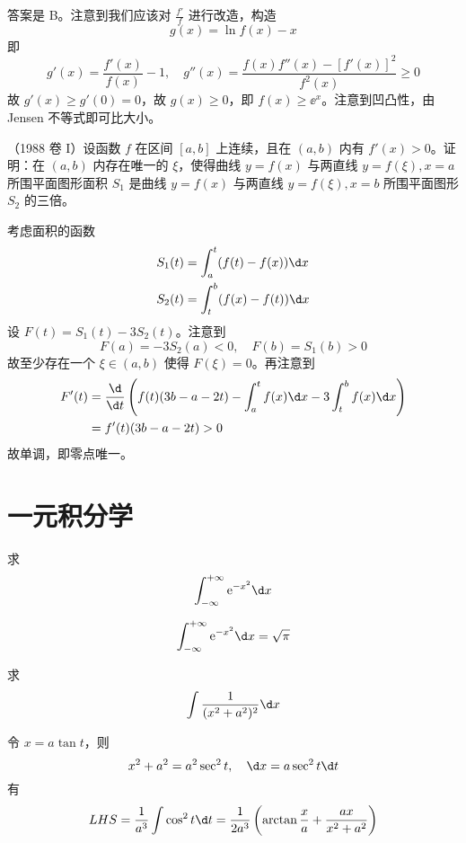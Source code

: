 \begin{solution}
	答案是 B。注意到我们应该对 $\frac{f'}{f}$ 进行改造，构造
	\[ g(x) = \ln f(x) - x \]
	即
	\[ g'(x) = \frac{f'(x)}{f(x)} - 1, \quad g''(x) = \frac{f(x) f''(x) - [f'(x)]^2}{f^2(x)} \geqslant 0 \]
	故 $g'(x) \geqslant g'(0) = 0$，故 $g(x) \geqslant 0$，即 $f(x) \geqslant \ee^x$。注意到凹凸性，由 Jensen 不等式即可比大小。
\end{solution}

\begin{problem}[000032]
	（1988 卷 I）设函数 $f$ 在区间 $[a, b]$ 上连续，且在 $(a, b)$ 内有 $f'(x) > 0$。证明：在 $(a, b)$ 内存在唯一的 $\xi$，使得曲线 $y = f(x)$ 与两直线 $y = f(\xi), x = a$ 所围平面图形面积 $S_1$ 是曲线 $y = f(x)$ 与两直线 $y = f(\xi), x = b$ 所围平面图形 $S_2$ 的三倍。
\end{problem}

\begin{solution}
	考虑面积的函数
	\[  \begin{aligned}
		S_1(t) &= \int_{a}^{t} (f(t) - f(x)) \d x \\
		S_2(t) &= \int_{t}^{b} (f(x) - f(t)) \d x
	\end{aligned} \]
	设 $F(t) = S_1(t) - 3S_2(t)$。注意到
	\[ F(a) = -3S_2(a) < 0, \quad F(b) = S_1(b) > 0 \]
	故至少存在一个 $\xi \in (a, b)$ 使得 $F(\xi) = 0$。再注意到
	\[ \begin{aligned}
		F'(t) 
	&= \frac{\d}{\d t}\left( f(t)(3b - a - 2t) - \int_{a}^{t} f(x) \d x - 3 \int_{t}^{b} f(x) \d x \right) \\
	&= f'(t) (3b - a - 2t) > 0
	\end{aligned} \]
	故单调，即零点唯一。
\end{solution}


\section{一元积分学}

\begin{problem}[000008]
求
\[ \int_{-\infty}^{+\infty} \ee^{-x^2}\d x \]
\end{problem}
\begin{solution}
	\[ \int_{-\infty}^{+\infty} \ee^{-x^2}\d x = \sqrt{\pi} \]
\end{solution}

\begin{problem}[000014]
求
\[ \int \frac{1}{(x^2+a^2)^2} \d x \]
\end{problem}
\begin{solution}
	令 $x = a \tan t$，则
	\[ x^2 + a^2 = a^2 \sec^2 t, \quad \d x = a \sec^2 t \d t \]
	有
	\[ LHS =  \frac{1}{a^3}\int \cos^2 t \d t = \frac{1}{2a^3} \left( \arctan \frac{x}{a} + \frac{ax}{x^2+a^2} \right) \]
\end{solution}


